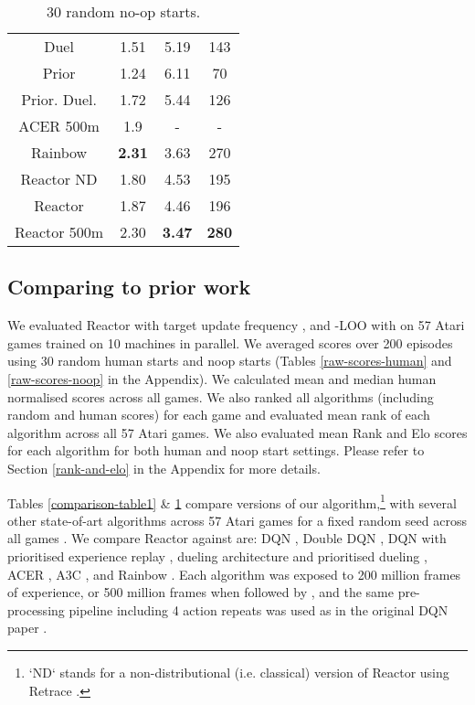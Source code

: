 \documentclass{article}
\begin{document}
\begin{table}[ht]
\begin{minipage}{.35\textwidth}
\begin{center}
\begin{small}
\begin{sc}
\begin{tabular}{| c | c | c | c |}
Duel & 1.51 & 5.19 & 143\\
Prior & 1.24 & 6.11 & 70\\
Prior. Duel. & 1.72 & 5.44 & 126\\
ACER 500m & 1.9 & - & - \\
Rainbow & {\bf 2.31} & 3.63 & 270\\
Reactor ND  & 1.80 & 4.53 & 195\\
Reactor & 1.87 & 4.46 & 196\\
Reactor 500m & 2.30 & {\bf 3.47} & {\bf 280}\\
\hline
\end{tabular}
\clearpage{}
\end{sc}
\hfill
\end{small}
\end{center}
\vspace{-0.2in}
\caption{\small 30 random no-op starts.}
\label{comparison-table3}
\end{minipage}
\end{table}
\subsection{Comparing to prior work}
We evaluated Reactor with target update frequency , 
 and -LOO with  on 
57 Atari games trained on 10 machines in parallel. 
We averaged scores over 200 episodes using 30 random human starts 
and noop starts (Tables \ref{raw-scores-human} and 
\ref{raw-scores-noop} in the Appendix). We calculated mean and 
median human normalised scores across all games. We also ranked 
all algorithms (including random and human scores) for each game and evaluated 
mean rank of each algorithm across all 57 Atari games. We also evaluated mean
Rank and Elo scores for each algorithm for both human and noop start settings. Please refer to Section 
\ref{rank-and-elo} in the Appendix for more details.

Tables \ref{comparison-table1} \& \ref{comparison-table3} compare versions of our algorithm,\footnote{
  \label{reactorfootnote}
  `ND` stands for a non-distributional (i.e. classical) version of Reactor 
  using Retrace \citep{munos2016safe}.
} with several other state-of-art algorithms across 57 Atari games for a 
fixed random seed across all games \citep{bellemare2013arcade}. 
We compare Reactor against are: DQN \citep{mnih15human}, Double 
DQN \citep{van2016deep}, DQN with prioritised experience replay 
\citep{schaul2015prioritized}, dueling architecture and prioritised dueling 
\citep{wang2015dueling}, ACER \citep{wang2017sample}, A3C \citep{mnih2016asynchronous}, and Rainbow \citep{rainbow}. 
Each algorithm was exposed to 200 million 
frames of experience, or 500 million frames when followed by , and the same pre-processing 
pipeline including 4 action repeats was used as in the original DQN paper \citep{mnih15human}. 
\end{document}

